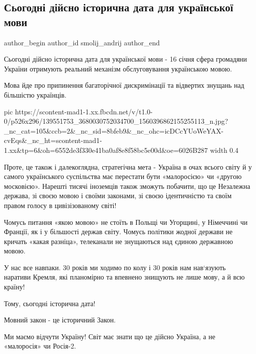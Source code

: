  
 
 
 
 
\subsection{Сьогодні дійсно історична дата для української мови}
\label{sec:16_01_2021.fb.smolii_andrii.1.zakon_pro_movu}
\ifcmt
  author_begin
   author_id smolij_andrij
  author_end
\fi

Сьогодні дійсно історична дата для української мови - 16 січня сфера громадяни
України отримують реальний механізм обслуговування українською мовою. 

Мова йде про припинення багаторічної дискримінації та відвертих знущань над
більшістю українців.


\ifcmt
  pic https://scontent-mad1-1.xx.fbcdn.net/v/t1.0-0/p526x296/139551753_3680030752034700_1560396862155255113_n.jpg?_nc_cat=105&ccb=2&_nc_sid=8bfeb9&_nc_ohc=icDCcYUoWeYAX-cvEqs&_nc_ht=scontent-mad1-1.xx&tp=6&oh=6552de3f330e41ba0af8e8f58bc5e00d&oe=6026B287
  width 0.4
\fi


Проте, це також і далекоглядна, стратегічна мета - Україна в очах всього світу
й у самого українського суспільства має перестати бути «малоросією» чи «другою
московією». Нарешті тисячі іноземців також зможуть побачити, що це Незалежна
держава, зі своєю мовою і своїми законами, зі своєю ідентичністю та своїм
правом голосу в цивізізованому світі! 

Чомусь питання «якою мовою» не стоїть в Польщі чи Угорщині, у Німеччині чи
Франції, як і у більшості держав світу. Чомусь політики жодної держави не
кричать «какая разніца», телеканали не знущаються над єдиною державною мовою. 

У нас все навпаки. 30 років ми ходимо по колу і 30 років нам нав‘язують
наративи Кремля, які планомірно та впевнено знищують не лише мову, а й всю
країну! 

Тому, сьогодні історична дата! 

Мовний закон - це історичний Закон. 

Ми маємо відчути Україну! Світ має знати що це дійсно Україна, а не «малоросія»
чи Росія-2.

